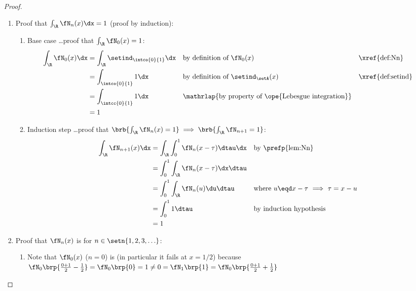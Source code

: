 \begin{proof}
\begin{enumerate}
  \item Proof that $\int_\R\fN_n(x)\dx=1$ (proof by induction):
    \begin{enumerate}
      \item Base case \ldots proof that $\int_\R\fN_0(x)=1$:
        \begin{align*}
          \int_\R\fN_0(x)\dx
            &= \int_\R\setind_\intco{0}{1}\dx
            && \text{by definition of $\fN_0(x)$}
            && \text{\xref{def:Nn}}
          \\&= \int_\intco{0}{1}1\dx
            && \text{by definition of $\setind_\setA(x)$}
            && \text{\xref{def:setind}}
          \\&= \int_\intcc{0}{1}1\dx
            && \mathrlap{\text{by property of \ope{Lebesgue integration}}}
          \\&= 1
        \end{align*}
      \item Induction step \ldots proof that $\brb{\int_\R\fN_n(x)=1}\implies\brb{\int_\R\fN_{n+1}=1}$:
        \begin{align*}
          \int_\R\fN_{n+1}(x)\dx
            &= \int_\R\int_0^1\fN_n(x-\tau)\dtau\dx
            && \text{by \prefp{lem:Nn}}
          \\&= \int_0^1\int_\R\fN_n(x-\tau)\dx\dtau
          \\&= \int_0^1\int_\R\fN_n(u)\du\dtau
            && \text{where $u\eqd x-\tau$ $\implies$ $\tau=x-u$}
          \\&= \int_0^1 1 \dtau
            && \text{by induction hypothesis}
          \\&= 1
        \end{align*}
    \end{enumerate}

  \item Proof that $\fN_n(x)$ is  for $n\in\setn{1,2,3,\ldots}$:
    \begin{enumerate}
      \item Note that $\fN_0(x)$ ($n=0$) is  (in particular it fails at $x=1/2$) because
        \\\indentx $ \fN_0\brp{\frac{0+1}{2}-\frac{1}{2}}
                       = \fN_0\brp{0}
                       = 1
                       \neq 0
                       = \fN_1\brp{1}
                       = \fN_0\brp{\frac{0+1}{2}+\frac{1}{2}}
                   $


\end{enumerate}
\end{enumerate}
\end{proof}
